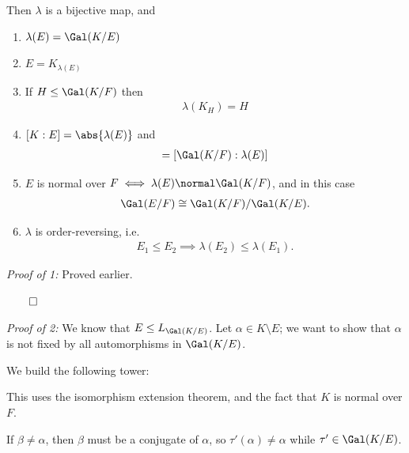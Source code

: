 Then \(\lambda\) is a bijective map, and

\begin{enumerate}
\def\labelenumi{\arabic{enumi}.}
\item
  \(\lambda(E) = \Gal(K/E)\)
\item
  \(E = K_{\lambda(E)}\)
\item
  If \(H \leq \Gal(K/F)\) then
  \begin{align*}
  \lambda(K_H) = H
  \end{align*}
\item
  \([K: E] = \abs{\lambda(E)}\) and
  \begin{align*}
  [E: F] = [\Gal(K/F): \lambda(E)]
  \end{align*}
\item
  \(E\) is normal over \(F \iff \lambda(E) \normal \Gal(K/F)\), and in
  this case
  \begin{align*}
  \Gal(E/F) \cong \Gal(K/F) / \Gal(K/E)
  .\end{align*}
\item
  \(\lambda\) is order-reversing, i.e.
  \begin{align*}
  E_1 \leq E_2 \implies \lambda(E_2) \leq \lambda(E_1)
  .\end{align*}
\end{enumerate}

\emph{Proof of 1:} Proved earlier.

\(\qed\)

\emph{Proof of 2:} We know that \(E \leq L_{\Gal(K/E)}\). Let
\(\alpha \in K\setminus E\); we want to show that \(\alpha\) is not
fixed by all automorphisms in \(\Gal(K/E)\).

We build the following tower:

\begin{center}
\end{center}

This uses the isomorphism extension theorem, and the fact that \(K\) is
normal over \(F\).

If \(\beta\neq \alpha\), then \(\beta\) must be a conjugate of
\(\alpha\), so \(\tau'(\alpha) \neq \alpha\) while
\(\tau' \in \Gal(K/E)\).

